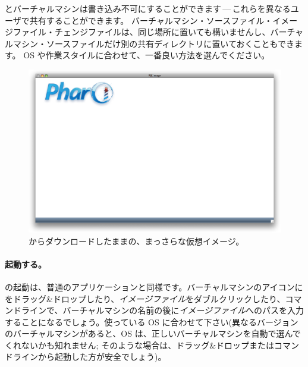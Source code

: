 \documentclass[a4paper,10pt,twoside]{book}
\begin{document}
とバーチャルマシンは書き込み不可にすることができます\,---\,これらを異なるユーザで共有することができます。
バーチャルマシン・ソースファイル・イメージファイル・チェンジファイルは、同じ場所に置いても構いませんし、バーチャルマシン・ソースファイルだけ別の共有ディレクトリに置いておくこともできます。
OS や作業スタイルに合わせて、一番良い方法を選んでください。


\begin{figure}[htb]
\centerline {\includegraphics[width=\textwidth]{startup}}
\caption{\pbe からダウンロードしたままの、まっさらな仮想イメージ。}
\end{figure}

\paragraph{起動する。} \pharo の起動は、普通のアプリケーションと同様です。バーチャルマシンのアイコンにをドラッグ\&ドロップしたり、\emph{イメージファイル}をダブルクリックしたり、コマンドラインで、バーチャルマシンの名前の後に\emph{イメージファイル}へのパスを入力することになるでしょう。使っている OS に合わせて下さい(異なるバージョンのバーチャルマシンがあると、OS は、正しいバーチャルマシンを自動で選んでくれないかも知れません; そのような場合は、ドラッグ\&ドロップまたはコマンドラインから起動した方が安全でしょう)。
\end{document}
